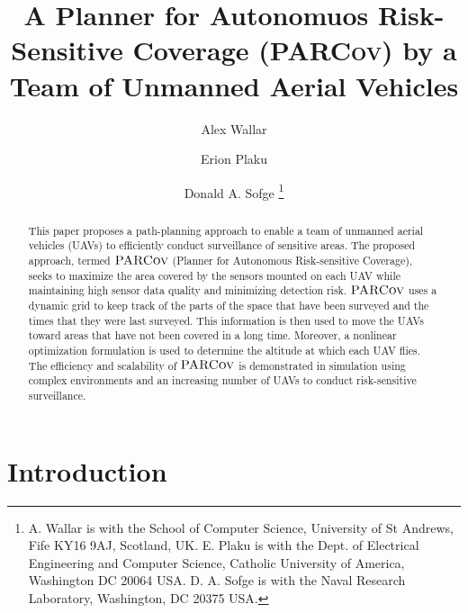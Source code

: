 \documentclass[letterpaper, 10pt, conference]{ieeeconf}
\newcommand{\Function}[1]{\ensuremath{{ \textsc{#1}}}}
\newcommand{\Name}{\Function{\small{PARCov}}}
\begin{document}
\title{A Planner for Autonomuos Risk-Sensitive Coverage
  (\textsc{PARCov}) by a\\
Team of Unmanned Aerial Vehicles}


\author{Alex Wallar \and Erion Plaku \and Donald A. Sofge
\thanks{A. Wallar is with the School of Computer Science,
  University of St Andrews, Fife KY16 9AJ, Scotland, UK. E. Plaku is with the
  Dept. of Electrical Engineering and Computer Science, Catholic
  University of America, Washington DC 20064 USA. D. A. Sofge is with
  the Naval Research Laboratory, Washington, DC 20375 USA.
}}


\maketitle
\begin{abstract}

This paper proposes a path-planning approach to enable a team of
unmanned aerial vehicles (UAVs) to efficiently conduct surveillance of
sensitive areas. The proposed approach, termed $\Name$ (Planner for
Autonomous Risk-sensitive Coverage), seeks to maximize the area covered by the
sensors mounted on each UAV while maintaining high sensor data quality
and minimizing detection risk.  $\Name$ uses a dynamic grid to keep
track of the parts of the space that have been surveyed and the times
that they were last surveyed. This information is then used to move
the UAVs toward areas that have not been covered in a long time.
Moreover, a nonlinear optimization formulation is used to determine
the altitude at which each UAV flies. The efficiency and scalability
of $\Name$ is demonstrated in simulation using complex environments
and an increasing number of UAVs to conduct risk-sensitive
surveillance.

\end{abstract}


\section{Introduction}
\label{sec:Intro}




\end{document}
